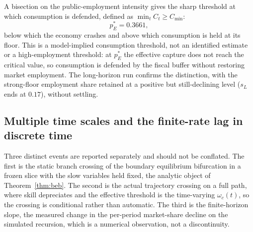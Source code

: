 \documentclass[review,12pt]{elsarticle}
\theoremstyle{plain}
\theoremstyle{definition}
\theoremstyle{remark}
\begin{document}
A bisection on the public-employment intensity gives the sharp threshold at which consumption is defended, defined as $\min_t C_t\ge C_{\min}$:
\begin{equation*}
p_E^{*}=0.3661,
\end{equation*}
below which the economy crashes and above which consumption is held at its floor. This is a model-implied consumption threshold, not an identified estimate or a high-employment threshold: at $p_E^*$ the effective capture does not reach the critical value, so consumption is defended by the fiscal buffer without restoring market employment. The long-horizon run confirms the distinction, with the strong-floor employment share retained at a positive but still-declining level ($s_L$ ends at $0.17$), without settling.

\subsection{Multiple time scales and the finite-rate lag in discrete time}
Three distinct events are reported separately and should not be conflated. The first is the static branch crossing of the boundary equilibrium bifurcation in a frozen slice with the slow variables held fixed, the analytic object of Theorem~\ref{thm:beb}. The second is the actual trajectory crossing on a full path, where skill depreciates and the effective threshold is the time-varying $\omega_c(t)$, so the crossing is conditional rather than automatic. The third is the finite-horizon slope, the measured change in the per-period market-share decline on the simulated recursion, which is a numerical observation, not a discontinuity.
\end{document}
